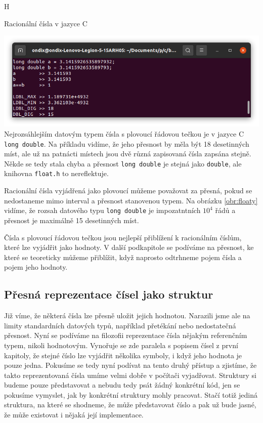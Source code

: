 \begin{myfigure}{H}
\caption{Racionální čísla v jazyce C}
\includegraphics[width=\linewidth]{./graphics/floaty.png}\label{obr:floaty}
Nejrozsáhlejším datovým typem čísla s plovoucí řádovou tečkou je v jazyce C \texttt{long double}. Na příkladu vidíme, že jeho přesnost by měla být 18 desetinných míst, ale už na patnácti místech jsou dvě různá zapisovaná čísla zapsána stejně. Někde se tedy stala chyba a přesnost \texttt{long double} je stejná jako \texttt{double}, ale knihovna \texttt{float.h} to nereflektuje.
\end{myfigure}

Racionální čísla vyjádřená jako plovoucí můžeme považovat za přesná, pokud se nedostaneme mimo interval a přesnost stanovenou typem. Na obrázku \ref{obr:floaty} vidíme, že rozsah datového typu \texttt{long double} je impozatntních $10^4$ řádů a přesnost je maximálně 15 desetinných míst.

Čísla s plovoucí řádovou tečkou jsou nejlepší přiblížení k racionálním číslům, které lze vyjádřit jako hodnoty. V další podkapitole se podíváme na přesnost, ke které se teoreticky můžeme přiblížit, když naprosto odtrhneme pojem čísla a pojem jeho hodnoty.

\subsection{Přesná reprezentace čísel jako struktur}
Již víme, že některá čísla lze přesně uložit jejich hodnotou. Narazili jsme ale na limity standardních datových typů, například přetékání nebo nedostatečná přesnost. Nyní se podíváme na filozofii reprezentace čísla nějakým referenčním typem, nikoli hodnotovým. Vynořuje se zde paralela s popisem čísel z první kapitoly, že stejné číslo lze vyjádřit několika symboly, i když jeho hodnota je pouze jedna. Pokusíme se tedy nyní podívat na tento druhý přístup a zjistíme, že takto reprezentovaná čísla umíme velmi dobře v počítači vyjadřovat. Struktury si budeme pouze představovat a nebudu tedy psát žádný konkrétní kód, jen se pokusíme vymyslet, jak by konkrétní struktury mohly pracovat. Stačí totiž jediná struktura, na které se shodneme, že může představovat číslo a pak už bude jasné, že může existovat i nějaká její implementace.

